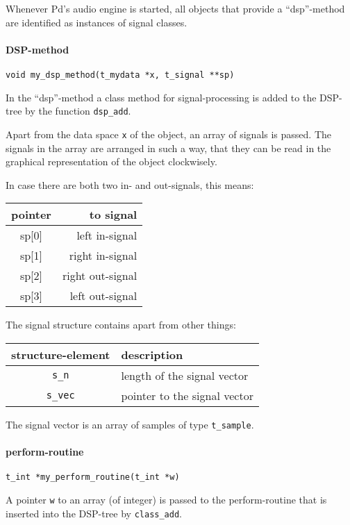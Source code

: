 \documentclass[12pt, a4paper,english,titlepage]{article}
\begin{document}
\begin{appendix}
Whenever Pd's audio engine is started,
all objects that provide a ``dsp''-method are identified as instances of signal classes.

\paragraph{DSP-method}

\begin{verbatim}
void my_dsp_method(t_mydata *x, t_signal **sp)
\end{verbatim}

In the ``dsp''-method a class method for signal-processing
is added to the DSP-tree by the function \verb+dsp_add+.

Apart from the data space \verb+x+ of the object,
an array of signals is passed.
The signals in the array are arranged in such a way,
that they can be read in the graphical representation of the object
clockwisely.

In case there are both two in- and out-signals, this means:

\begin{tabular}{c|r}
pointer & to signal \\
\hline\hline
sp[0] & left in-signal \\
sp[1] & right in-signal \\
sp[2] & right out-signal \\
sp[3] & left out-signal \\
\end{tabular}

The signal structure contains apart from other things:

\begin{tabular}{c|l}
structure-element & description \\
\hline
\verb+s_n+ & length of the signal vector \\
\verb+s_vec+ & pointer to the signal vector \\
\end{tabular}

The signal vector is an array of samples of type  \verb+t_sample+.

\paragraph{perform-routine}
\begin{verbatim}
t_int *my_perform_routine(t_int *w)
\end{verbatim}


A pointer \verb+w+ to an array (of integer) is passed to
the perform-routine that is inserted into the DSP-tree by \verb+class_add+.


\end{appendix}
\end{document}
